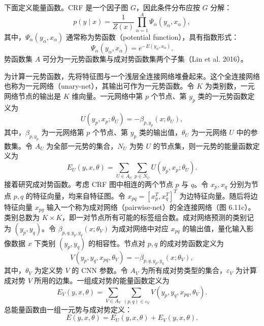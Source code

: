 下面定义能量函数。CRF 是一个因子图 $G$，因此条件分布应按 $G$ 分解：
\begin{equation}
p(y\mid x)=\frac1{Z(x)}\prod_{\alpha=1}^A\Psi_{\alpha}(y_{\alpha},x_{\alpha}),
\tag{6.130}
\end{equation}
其中，$\Psi_{\alpha}(y_{\alpha},x_{\alpha})$ 通常称为势函数（potential function），具有指数形式：
\begin{equation}
\Psi_{\alpha}(y_{\alpha},x_{\alpha})=e^{-E(y_{\alpha},x_{\alpha})}.
\tag{6.131}
\end{equation}
势函数集 $A$ 可分为一元势函数集与成对势函数集两个子集（Lin et al. 2016）。

为计算一元势函数，先将特征图与一个浅层全连接网络堆叠起来。这个全连接网络也称为一元网络（unary-net），其输出可作为一元势函数。令 $K$ 为类别数，一元网络节点的输出是 $K$ 维向量。一元网络中第 $p$ 个节点、第 $y_p$ 类的一元势函数定义为
\begin{equation}
U(y_p,x_p;\theta_U)=-\beta_{p,y_p}(x;\theta_U),
\tag{6.132}
\end{equation}
其中，$\beta_{p,y_p}$ 为一元网络第 $p$ 个节点、第 $y_p$ 类的输出值，$\theta_U$ 为一元网络 $U$ 中的参数集。令 $A_U$ 为全部一元势的集合，$N_U$ 为势 $U$ 的节点集，则一元势的能量函数定义为
\begin{equation}
E_U(y,x,\theta)=\sum_{U\in A_U}\sum_{p\in N_U}U(y_p,x_p;\theta_U).
\tag{6.133}
\end{equation}
接着研究成对势函数。考虑 CRF 图中相连的两个节点 $p$ 与 $q$。令 $x_p,x_q$ 分别为节点 $p,q$ 的特征向量，均来自特征图。令 $x_{pq}=[x_p^T,x_q^T]^T$ 为边特征向量。随后将边特征向量 $x_{pg}$ 输入一个称为成对网络（pairwise-net）的全连接网络（图 6.11c）。类别总数为 $K\times K$，即一对节点所有可能的标签组合数。成对网络预测的类别记为 $(y_p,y_q)$。令 $\beta_{p,q,y_p,y_q}(x;\theta_V)$ 为成对网络中对应 $x_{pq}$ 的输出值，量化输入影像数据 $x$ 下类别 $(y_p,y_q)$ 的相容性。节点对 $p,q$ 的成对势函数定义为
\begin{equation}
V(y_p,y_q,x_{pq},\theta_V)=-\beta_{p,q,y_p,y_q}(x;\theta_V),
\tag{6.134}
\end{equation}
其中，$\theta_V$ 为定义势 $V$ 的 CNN 参数。令 $A_V$ 为所有成对势类型的集合，$\varepsilon_V$ 为计算成对势 $V$ 所用的边集。一组成对势的能量函数定义为
\begin{equation}
E_V(y,x,\theta)=\sum_{V\in A_V}\sum_{(p,q)\in\varepsilon_V}V(y_p,y_q,x_{pq},\theta_V).
\tag{6.135}
\end{equation}
总能量函数由一组一元势与成对势定义：
\begin{equation}
E(y,x,\theta)=E_U(y,x,\theta)+E_V(y,x,\theta).
\tag{6.136}
\end{equation}

